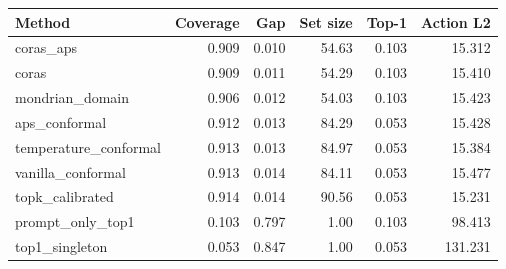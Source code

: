\begin{tabular}{lrrrrr}
\toprule
Method & Coverage & Gap & Set size & Top-1 & Action L2 \\
\midrule
coras\_aps & 0.909 & 0.010 & 54.63 & 0.103 & 15.312 \\
coras & 0.909 & 0.011 & 54.29 & 0.103 & 15.410 \\
mondrian\_domain & 0.906 & 0.012 & 54.03 & 0.103 & 15.423 \\
aps\_conformal & 0.912 & 0.013 & 84.29 & 0.053 & 15.428 \\
temperature\_conformal & 0.913 & 0.013 & 84.97 & 0.053 & 15.384 \\
vanilla\_conformal & 0.913 & 0.014 & 84.11 & 0.053 & 15.477 \\
topk\_calibrated & 0.914 & 0.014 & 90.56 & 0.053 & 15.231 \\
prompt\_only\_top1 & 0.103 & 0.797 & 1.00 & 0.103 & 98.413 \\
top1\_singleton & 0.053 & 0.847 & 1.00 & 0.053 & 131.231 \\
\bottomrule
\end{tabular}